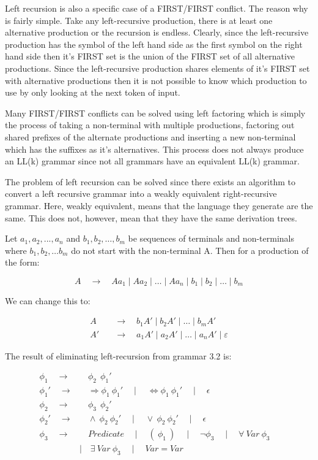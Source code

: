 Left recursion is also a specific case of a FIRST/FIRST conflict. The reason why is fairly simple. Take any left-recursive production, there is at least one alternative production or the recursion is endless. Clearly, since the left-recursive production has the symbol of the left hand side as the first symbol on the right hand side then it's FIRST set is the union of the FIRST set of all alternative productions. Since the left-recursive production shares elements of it's FIRST set with alternative productions then it is not possible to know which production to use by only looking at the next token of input. 

Many FIRST/FIRST conflicts can be solved using left factoring which is simply the process of taking a non-terminal with multiple productions, factoring out shared prefixes of the alternate productions and inserting a new non-terminal which has the suffixes as it's alternatives.  This process does not always produce an LL(k) grammar since not all grammars have an equivalent LL(k) grammar.

The problem of left recursion can be solved since there exists an algorithm to convert a left recursive grammar into a weakly equivalent right-recursive grammar. Here, weakly equivalent, means that the language they generate are the same. This does not, however, mean that they have the same derivation trees. 

Let  $a_1, a_2, ... ,a_n$  and $b_1, b_2, … ,b_m $ be sequences of terminals and non-terminals where $b_1, b_2, … b_m$  do not start with the non-terminal A. Then for a production of the form:

$$ A \quad \to \quad A a_1 \mid A a_2 \mid \ldots \mid A a_n \mid b_1 \mid b_2 \mid \ldots \mid b_m $$

\noindent We can change this to:


\begin{align*}
A \quad &\to \quad b_1 A' \mid  b_2 A' \mid \ldots \mid b_m A' 
\\ A' \quad &\to \quad a_1  A' \mid a_2  A' \mid \ldots \mid a_n A' \mid ε
\end{align*}


\noindent The result of eliminating left-recursion from grammar 3.2 is:

\begin{equation}
\begin{aligned}
\phi_1 \quad \to& \quad \phi_2 \:\: \phi_1'
\\ \phi_1' \quad \to& \quad \Rightarrow \phi_1\: \phi_1' \quad
\mid \quad \Leftrightarrow \phi_1 \: \phi_1' \quad
\mid \quad \epsilon \quad
\\
\phi_2 \quad \to& \quad \phi_3 \:\: \phi_2'
\\ \phi_2' \quad \to& \quad \land \: \phi_2 \: \phi_2' \quad 
\mid \quad \lor \: \phi_2 \: \phi_2' \quad 
\mid \quad \epsilon \quad
\\
\phi_3 \quad \to& \quad Predicate \quad
\mid \quad ( \: \phi_1 \: ) \quad
\mid \quad \lnot \phi_3 \quad
\mid \quad \forall \: Var \: \phi_3 \quad
\\ &\mid \quad \exists \: Var \:\phi_3 \quad
\mid \quad Var = Var 
\end{aligned}
\end{equation}



